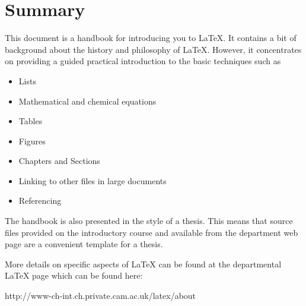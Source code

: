 \chapter*{Summary}
This document is a handbook for introducing you to LaTeX. It contains a bit of background about the history and philosophy of LaTeX.  However, it concentrates on providing a guided practical introduction to the basic techniques such as 
\begin{itemize}
\item Lists
\item Mathematical and chemical equations
\item Tables
\item Figures
\item Chapters and Sections
\item Linking to other files in large documents
\item Referencing
\end{itemize}

The handbook is also presented in the style of a thesis. This means that source files provided on the introductory course and available from the department web page are a convenient template for a thesis.

More details on specific aspects of LaTeX can be found at the departmental LaTeX page which can be found here:

 http://www-ch-int.ch.private.cam.ac.uk/latex/about
